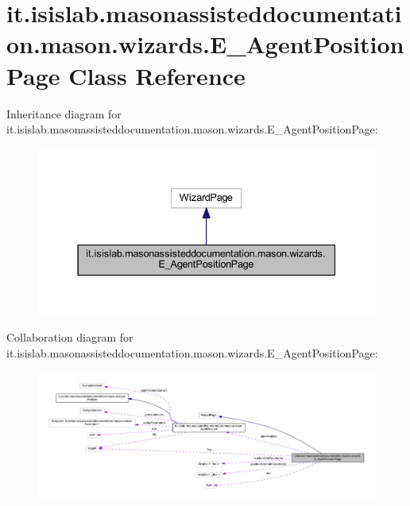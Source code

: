 \hypertarget{classit_1_1isislab_1_1masonassisteddocumentation_1_1mason_1_1wizards_1_1_e___agent_position_page}{\section{it.\-isislab.\-masonassisteddocumentation.\-mason.\-wizards.\-E\-\_\-\-Agent\-Position\-Page Class Reference}
\label{classit_1_1isislab_1_1masonassisteddocumentation_1_1mason_1_1wizards_1_1_e___agent_position_page}
}


Inheritance diagram for it.\-isislab.\-masonassisteddocumentation.\-mason.\-wizards.\-E\-\_\-\-Agent\-Position\-Page\-:\nopagebreak
\begin{figure}[H]
\begin{center}
\leavevmode
\includegraphics[width=337pt]{classit_1_1isislab_1_1masonassisteddocumentation_1_1mason_1_1wizards_1_1_e___agent_position_page__inherit__graph}
\end{center}
\end{figure}


Collaboration diagram for it.\-isislab.\-masonassisteddocumentation.\-mason.\-wizards.\-E\-\_\-\-Agent\-Position\-Page\-:\nopagebreak
\begin{figure}[H]
\begin{center}
\leavevmode
\includegraphics[width=350pt]{classit_1_1isislab_1_1masonassisteddocumentation_1_1mason_1_1wizards_1_1_e___agent_position_page__coll__graph}
\end{center}
\end{figure}
